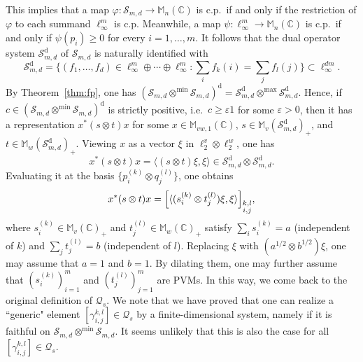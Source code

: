 \documentclass[12pt]{amsart}
\theoremstyle{definition}
\begin{document}
This implies that a map ${\varphi}\colon{{\mathcal S}}_{m,d}\to{{\mathbb M}}_n({{\mathbb C}})$ is c.p.\ if and only if
the restriction of ${\varphi}$ to each summand $\ell_\infty^m$ is c.p.
Meanwhile, a map $\psi\colon\ell_\infty^m\to{{\mathbb M}}_n({{\mathbb C}})$ is c.p.\ if and only if
$\psi(p_i)\geq0$ for every $i=1,\ldots,m$.
It follows that the dual operator system ${{\mathcal S}}_{m,d}^{\mathrm{d}}$ of ${{\mathcal S}}_{m,d}$ is naturally
identified with
\[
{{\mathcal S}}_{m,d}^{\mathrm{d}}=\{ (f_1,\ldots,f_d) \in \ell_\infty^m\oplus\cdots\oplus\ell_\infty^m :
 \sum_i f_k(i)=\sum_j f_l(j)\} \subset \ell_\infty^{dm}.
\]
By Theorem~\ref{thm:fp}, one has
$({{\mathcal S}}_{m,d}\otimes^{\min}{{\mathcal S}}_{m,d})^{\mathrm{d}}={{\mathcal S}}_{m,d}^{\mathrm{d}}\otimes^{\max}{{\mathcal S}}_{m,d}^{\mathrm{d}}$.
Hence, if $c\in ({{\mathcal S}}_{m,d}\otimes^{\min}{{\mathcal S}}_{m,d})^{\mathrm{d}}$ is strictly positive,
i.e.\ $c\geq{\varepsilon}1$ for some ${\varepsilon}>0$,
then it has a representation $x^*(s\otimes t)x$ for some $x\in{{\mathbb M}}_{vw,1}({{\mathbb C}})$,
$s\in{{\mathbb M}}_v({{\mathcal S}}_{m,d}^{\mathrm{d}})_+$, and $t\in{{\mathbb M}}_w({{\mathcal S}}_{m,d}^{\mathrm{d}})_+$.
Viewing $x$ as a vector $\xi$ in $\ell_2^v\otimes\ell_2^w$, one has
\[
x^*(s\otimes t)x = {\mathopen{\langle}{(s\otimes t) \xi,\xi}\mathclose{\rangle}} \in {{\mathcal S}}_{m,d}^{\mathrm{d}}\otimes{{\mathcal S}}_{m,d}^{\mathrm{d}}.
\]
Evaluating it at the basis $\{ p^{(k)}_i\otimes q^{(l)}_j \}$, one obtains
\[
x^*(s\otimes t)x = {\left[ { {\mathopen{\langle}{(s^{(k)}_i\otimes t^{(l)}_j)\xi,\xi}\mathclose{\rangle}}} \right]}_{\begin{subarray}{c}k,l\\ i,j\end{subarray}},
\]
where $s^{(k)}_i\in{{\mathbb M}}_v({{\mathbb C}})_+$ and $t^{(l)}_j\in{{\mathbb M}}_w({{\mathbb C}})_+$ satisfy $\sum_i s^{(k)}_i = a$ (independent of $k$)
and $\sum_j t^{(l)}_j=b$ (independent of $l$).
Replacing $\xi$ with $(a^{1/2}\otimes b^{1/2})\xi$, one may assume that $a=1$ and $b=1$.
By dilating them, one may further assume that $(s^{(k)}_i)_{i=1}^m$ and $(t^{(l)}_j)_{j=1}^m$
are PVMs.
In this way, we come back to the original definition of ${{\mathcal Q}}_s$.
We note that we have proved that one can realize a ``generic" element $[\gamma_{i,j}^{k,l}] \in {{\mathcal Q}}_s$
by a finite-dimensional system, namely if it is faithful on ${{\mathcal S}}_{m,d}\otimes^{\min}{{\mathcal S}}_{m,d}$.
It seems unlikely that this is also the case for all $[\gamma_{i,j}^{k,l}] \in {{\mathcal Q}}_s$.
\end{document}
